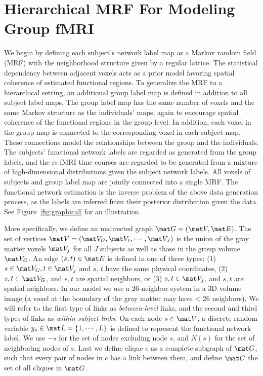 \documentclass[review,authoryear]{elsarticle}
\begin{document}
\section{Hierarchical MRF For Modeling Group fMRI}
\label{sec:model}
We begin by defining each subject's network label map as a Markov random field
(MRF) with the neighborhood structure given by a regular lattice. The
statistical dependency between adjacent voxels acts as a prior model favoring
spatial coherence of estimated functional regions. To generalize the MRF to a
hierarchical setting, an additional group label map is defined in addition to all
subject label maps. The group label map has the same number of voxels and the same
Markov structure as the individuals' maps, again to encourage spatial coherence of the
functional regions in the group level. In addition, each voxel in the group map
is connected to the corresponding voxel in each subject map. These connections model
the relationships between the group and the individuals. The subjects' functional network
labels are regarded as generated from the group labels, and
the rs-fMRI time courses are regarded to be generated from a mixture of
high-dimensional distributions given the subject network labels. All voxels of
subjects and group label map are jointly connected into a single MRF.  The functional
network estimation is the inverse problem of the above data generation process,
as the labels are inferred from their posterior distribution given the data. See
Figure~\ref{fig:graphical} for an illustration.

More specifically, we define an undirected graph $\mat G = (\mat V, \mat
E)$. The set of vertices $\mat V = (\mat V_G, \mat V_1, \cdots, \mat V_J)$ is
the union of the gray matter voxels $\mat V_j$ for all $J$ subjects as well as
those in the group volume $\mat V_G$.  An edge $(s, t) \in \mat E$ is defined in
one of three types: (1) $s\in \mat V_G, t\in \mat V_j$ and $s$, $t$ have the
same physical coordinates, (2) $s, t\in \mat V_G$, and $s, t$ are spatial
neighbors, or (3) $s, t\in \mat V_j$, and $s, t$ are spatial neighbors. In our
model we use a 26-neighbor system in a 3D volume image (a voxel at the boundary
of the gray matter may have < 26 neighbors). We will refer to the first type of
links as \emph{between-level} links, and the second and third types of links as
\emph{within-subject links}. On each node $s \in \mat V$, a discrete random
variable $y_s \in \mat L = \{1,\cdots, L\}$ is defined to represent the
functional network label. We use $-s$ for the set of nodes excluding node $s$,
and $N(s)$ for the set of neighboring nodes of $s$. Last we define clique c as a
complete subgraph of $\mat G $, such that every pair of nodes in $c$ has a
link between them, and define $\mat C$ the set of all cliques in $\mat G$.
\end{document}
